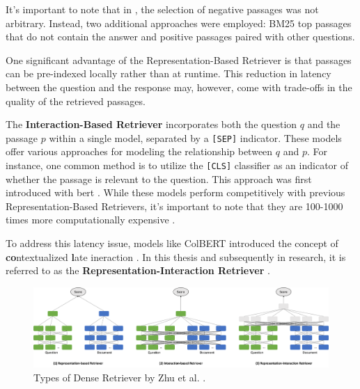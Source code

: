 It's important to note that in \cite{karpukhin_dense_2020}, the selection of negative passages was not arbitrary. Instead, two additional approaches were employed: BM25 top passages that do not contain the answer and positive passages paired with other questions.

One significant advantage of the Representation-Based Retriever is that passages can be pre-indexed locally rather than at runtime. This reduction in latency between the question and the response may, however, come with trade-offs in the quality of the retrieved passages.

The \textbf{Interaction-Based Retriever} incorporates both the question $q$ and the passage $p$ within a single model, separated by a \verb|[SEP]| indicator. These models offer various approaches for modeling the relationship between $q$ and $p$. For instance, one common method is to utilize the \verb|[CLS]| classifier as an indicator of whether the passage is relevant to the question. This approach was first introduced with \gls{bert} \cite{devlin_bert_2019}. While these models perform competitively with previous Representation-Based Retrievers, it's important to note that they are 100-1000 times more computationally expensive \cite{khattab_colbert_2020}.

To address this latency issue, models like ColBERT introduced the concept of \textbf{co}ntextualized \textbf{l}ate ineraction \cite{khattab_colbert_2020}. In this thesis and subsequently in research, it is referred to as the \textbf{Representation-Interaction Retriever} \cite{zhu_retrieving_2021}.


\begin{figure}
    \centering
    \includegraphics[width=\textwidth]{Grafiken/Types_of_Retriever.png}
    \caption{Types of Dense Retriever by Zhu et al. \cite{zhu_retrieving_2021}.}
    \label{fig:types_of_retriever}
\end{figure}

